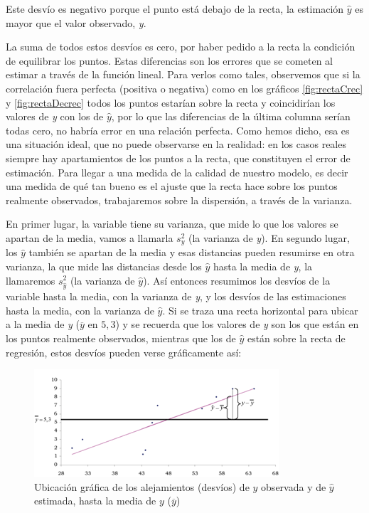 \documentclass[]{book}
\begin{document}
Este desvío es negativo porque el punto está debajo de la recta, la
estimación \(\widehat{y}\) es mayor que el valor observado, \emph{y}.

La suma de todos estos desvíos es cero, por haber pedido a la recta la
condición de equilibrar los puntos. Estas diferencias son los errores
que se cometen al estimar a través de la función lineal. Para verlos
como tales, observemos que si la correlación fuera perfecta (positiva o
negativa) como en los gráficos \ref{fig:rectaCrec} y \ref{fig:rectaDecrec} todos los puntos estarían sobre la
recta y coincidirían los valores de \emph{y} con los de \(\widehat{y}\), por lo
que las diferencias de la última columna serían todas cero, no habría
error en una relación perfecta. Como hemos dicho, esa es una situación
ideal, que no puede observarse en la realidad: en los casos reales
siempre hay apartamientos de los puntos a la recta, que constituyen el
error de estimación. Para llegar a una medida de la calidad de nuestro
modelo, es decir una medida de qué tan bueno es el ajuste que la recta
hace sobre los puntos realmente observados, trabajaremos sobre la
dispersión, a través de la varianza.

En primer lugar, la variable tiene su varianza, que mide lo que los
valores se apartan de la media, vamos a llamarla \(s_{y}^{2}\) (la
varianza de \emph{y}). En segundo lugar, los \(\widehat{y}\) también se apartan
de la media y esas distancias pueden resumirse en otra varianza, la que
mide las distancias desde los \(\widehat{y}\) hasta la media de \emph{y}, la
llamaremos \(s_{\widehat{y}}^{2}\) (la varianza de \(\widehat{y}\)). Así
entonces resumimos los desvíos de la variable hasta la media, con la
varianza de \emph{y}, y los desvíos de las estimaciones hasta la media, con
la varianza de \(\widehat{y}\). Si se traza una recta horizontal para
ubicar a la media de \emph{y} (\(\overline{y}\) en \(5,3\)) y se recuerda que los
valores de \emph{y} son los que están en los puntos realmente observados,
mientras que los de \(\widehat{y}\) están sobre la recta de regresión,
estos desvíos pueden verse gráficamente así:

\begin{figure}

{\centering \includegraphics{imagenes/grafico14} 

}

\caption{Ubicación gráfica de los alejamientos (desvíos) de $y$ observada y de $\widehat{y}$ estimada, hasta la media de $y$ ($\overline{y}$)}\label{fig:unnamed-chunk-163}
\end{figure}
\end{document}

